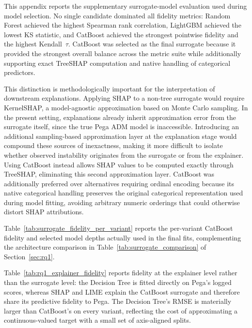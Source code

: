 \documentclass[oneside]{memoir} %
\begin{document}
This appendix reports the supplementary surrogate-model evaluation used during model selection. No single candidate dominated all fidelity metrics: Random Forest achieved the highest Spearman rank correlation, LightGBM achieved the lowest KS statistic, and CatBoost achieved the strongest pointwise fidelity and the highest Kendall~$\tau$. CatBoost was selected as the final surrogate because it provided the strongest overall balance across the metric suite while additionally supporting exact TreeSHAP computation and native handling of categorical predictors.

This distinction is methodologically important for the interpretation of downstream explanations. Applying SHAP to a non-tree surrogate would require KernelSHAP, a model-agnostic approximation based on Monte Carlo sampling. In the present setting, explanations already inherit approximation error from the surrogate itself, since the true Pega ADM model is inaccessible. Introducing an additional sampling-based approximation layer at the explanation stage would compound these sources of inexactness, making it more difficult to isolate whether observed instability originates from the surrogate or from the explainer. Using CatBoost instead allows SHAP values to be computed exactly through TreeSHAP, eliminating this second approximation layer. CatBoost was additionally preferred over alternatives requiring ordinal encoding because its native categorical handling preserves the original categorical representation used during model fitting, avoiding arbitrary numeric orderings that could otherwise distort SHAP attributions.

Table~\ref{tab:surrogate_fidelity_per_variant} reports the per-variant CatBoost fidelity and selected model depths actually used in the final fits, complementing the architecture comparison in Table~\ref{tab:surrogate_comparison} of Section~\ref{sec:rq1}.



Table~\ref{tab:rq1_explainer_fidelity} reports fidelity at the explainer level rather than the surrogate level: the Decision Tree is fitted directly on Pega's logged scores, whereas SHAP and LIME explain the CatBoost surrogate and therefore share its predictive fidelity to Pega. The Decision Tree's RMSE is materially larger than CatBoost's on every variant, reflecting the cost of approximating a continuous-valued target with a small set of axis-aligned splits.


\end{document}
